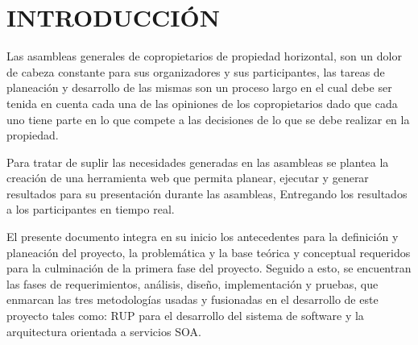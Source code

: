 
\chapter*{INTRODUCCIÓN}

\vspace{5mm}

Las asambleas generales de copropietarios de propiedad horizontal, son un dolor de cabeza constante para sus organizadores y sus participantes, las tareas de planeación y desarrollo de las mismas son un proceso largo en el cual debe ser tenida en cuenta cada una de las opiniones de los copropietarios dado que cada uno tiene parte en lo que compete a las decisiones de lo que se debe realizar en la propiedad.

\vspace{5mm}

Para tratar de suplir las necesidades generadas en las asambleas se plantea la creación de una herramienta web que permita planear, ejecutar y generar resultados para su presentación durante las asambleas, Entregando los resultados a los participantes en tiempo real.

\vspace{5mm}

El presente documento integra en su inicio los antecedentes para la definición y planeación del proyecto, la problemática y la base teórica y conceptual requeridos para la culminación de la primera fase del proyecto. Seguido a esto, se encuentran las fases de requerimientos, análisis, diseño, implementación y pruebas, que enmarcan las tres metodologías usadas y fusionadas en el desarrollo de este proyecto tales como: RUP para el desarrollo del sistema de software y la arquitectura orientada a servicios SOA.
\newpage